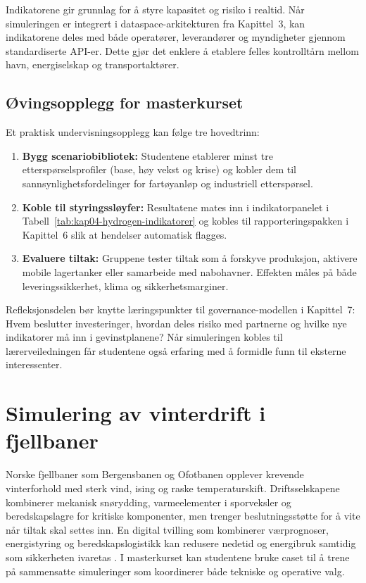 Indikatorene gir grunnlag for å styre kapasitet og risiko i realtid. Når simuleringen er integrert i dataspace-arkitekturen fra Kapittel~3, kan indikatorene deles med både operatører, leverandører og myndigheter gjennom standardiserte API-er. Dette gjør det enklere å etablere felles kontrolltårn mellom havn, energiselskap og transportaktører.

\subsection{Øvingsopplegg for masterkurset}
Et praktisk undervisningsopplegg kan følge tre hovedtrinn:
\begin{enumerate}
    \item \textbf{Bygg scenariobibliotek:} Studentene etablerer minst tre etterspørselsprofiler (base, høy vekst og krise) og kobler dem til sannsynlighetsfordelinger for fartøyanløp og industriell etterspørsel.
    \item \textbf{Koble til styringssløyfer:} Resultatene mates inn i indikatorpanelet i Tabell~\ref{tab:kap04-hydrogen-indikatorer} og kobles til rapporteringspakken i Kapittel~6 slik at hendelser automatisk flagges.
    \item \textbf{Evaluere tiltak:} Gruppene tester tiltak som å forskyve produksjon, aktivere mobile lagertanker eller samarbeide med nabohavner. Effekten måles på både leveringssikkerhet, klima og sikkerhetsmarginer.
\end{enumerate}
Refleksjonsdelen bør knytte læringspunkter til governance-modellen i Kapittel~7: Hvem beslutter investeringer, hvordan deles risiko med partnerne og hvilke nye indikatorer må inn i gevinstplanene? Når simuleringen kobles til lærerveiledningen får studentene også erfaring med å formidle funn til eksterne interessenter.

\section{Simulering av vinterdrift i fjellbaner}
Norske fjellbaner som Bergensbanen og Ofotbanen opplever krevende vinterforhold med sterk vind, ising og raske temperaturskift. Driftsselskapene kombinerer mekanisk snørydding, varmeelementer i sporveksler og beredskapslagre for kritiske komponenter, men trenger beslutningsstøtte for å vite når tiltak skal settes inn. En digital tvilling som kombinerer værprognoser, energistyring og beredskapslogistikk kan redusere nedetid og energibruk samtidig som sikkerheten ivaretas \citep{banenor2023vinterdrift,met2023fjellvaer}. I masterkurset kan studentene bruke caset til å trene på sammensatte simuleringer som koordinerer både tekniske og operative valg.

